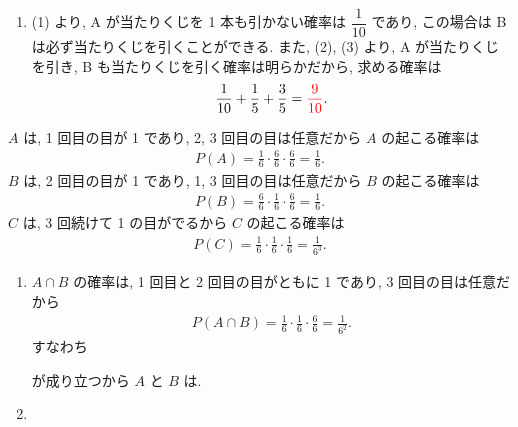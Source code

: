 \begin{qenumerate}
{\begin{enumerate}
{				\another
				後半の議論について, A が当たりくじを 1 本だけ引いた状態で B が当たりくじを 1 本も引かない確率は
				\begin{align}
					\frac{1}{3}\cdot\frac{0}{2} = 0
				\end{align}
				となり, B が少なくとも 1 本当たりくじを引く確率は
				\begin{align}
					1 - 0 = 1.
				\end{align}
				したがって, 求める確率は
				\begin{align}
					\frac{3}{5}\cdot 1 = \red{\frac{3}{5}}.
				\end{align}
			}
			\item{
				(1) より, A が当たりくじを 1 本も引かない確率は $\dfrac{1}{10}$ であり, この場合は B は必ず当たりくじを引くことができる.
				また, (2), (3) より, A が当たりくじを引き, B も当たりくじを引く確率は明らかだから, 求める確率は
				\begin{align}
					\frac{1}{10} + \frac{1}{5} + \frac{3}{5} = \textcolor{red}{\frac{9}{10}}.
				\end{align}
			}
		\end{enumerate}
	}
	\item{
		$A$ は, 1 回目の目が 1 であり, 2, 3 回目の目は任意だから $A$ の起こる確率は
		\begin{align}
			P(A) = \frac{1}{6}\cdot\frac{6}{6}\cdot\frac{6}{6} = \frac{1}{6}.
		\end{align}
		$B$ は, 2 回目の目が 1 であり, 1, 3 回目の目は任意だから $B$ の起こる確率は
		\begin{align}
			P(B) = \frac{6}{6}\cdot\frac{1}{6}\cdot\frac{6}{6} = \frac{1}{6}.
		\end{align}
		$C$ は, 3 回続けて 1 の目がでるから $C$ の起こる確率は
		\begin{align}
			P(C) = \frac{1}{6}\cdot\frac{1}{6}\cdot\frac{1}{6} = \frac{1}{6^{3}}.
		\end{align}
		\begin{enumerate}
			\item{
				$A\cap B$ の確率は, 1 回目と 2 回目の目がともに 1 であり, 3 回目の目は任意だから
				\begin{align}
					P(A\cap B) = \frac{1}{6}\cdot\frac{1}{6}\cdot\frac{6}{6} = \frac{1}{6^{2}}.
				\end{align}
				すなわち
				\begin{abstract}
					P(A\cap B) = P(A)P(B)
				\end{abstract}
				が成り立つから $A$ と $B$ は.
			}
			\item{
}
\end{enumerate}}
\end{qenumerate}
